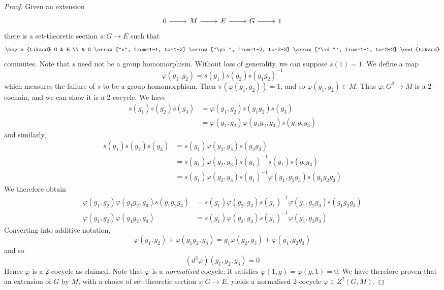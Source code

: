 \begin{proof}
    Given an extension
\[\begin{tikzcd}
	0 & M & E & G & 1
	\arrow[from=1-1, to=1-2]
	\arrow[from=1-2, to=1-3]
	\arrow[from=1-3, to=1-4]
	\arrow[from=1-4, to=1-5]
\end{tikzcd}\]
    there is a set-theoretic section \( s : G \to E \) such that
\[\begin{tikzcd}
	G & E \\
	& G
	\arrow["s", from=1-1, to=1-2]
	\arrow["\pi", from=1-2, to=2-2]
	\arrow["\id"', from=1-1, to=2-2]
\end{tikzcd}\]
    commutes.
    Note that \( s \) need not be a group homomorphism.
    Without loss of generality, we can suppose \( s(1) = 1 \).
    We define a map
    \[ \varphi(g_1, g_2) = s(g_1)s(g_2)s(g_1 g_2)^{-1} \]
    which measures the failure of \( s \) to be a group homomorphism.
    Then \( \pi(\varphi(g_1, g_2)) = 1 \), and so \( \varphi(g_1, g_2) \in M \).
    Thus \( \varphi : G^2 \to M \) is a 2-cochain, and we can show it is a 2-cocycle.
    We have
    \begin{align*}
        s(g_1) s(g_2) s(g_3) &= \varphi(g_1, g_2) s(g_1 g_2) s(g_3) \\
        &= \varphi(g_1, g_2) \varphi(g_1 g_2, g_3) s(g_1 g_2 g_3)
    \end{align*}
    and similarly,
    \begin{align*}
        s(g_1) s(g_2) s(g_3) &= s(g_1) \varphi(g_2, g_3) s(g_2 g_3) \\
        &= s(g_1) \varphi(g_2, g_3) s(g_1)^{-1} s(g_1) s(g_2 g_3) \\
        &= s(g_1) \varphi(g_2, g_3) s(g_1)^{-1} \varphi(g_1, g_2 g_3) s(g_1 g_2 g_3)
    \end{align*}
    We therefore obtain
    \begin{align*}
        \varphi(g_1, g_2) \varphi(g_1 g_2, g_3) s(g_1 g_2 g_3) &= s(g_1) \varphi(g_2, g_3) s(g_1)^{-1} \varphi(g_1, g_2 g_3) s(g_1 g_2 g_3) \\
        \varphi(g_1, g_2) \varphi(g_1 g_2, g_3) &= s(g_1) \varphi(g_2, g_3) s(g_1)^{-1} \varphi(g_1, g_2 g_3)
    \end{align*}
    Converting into additive notation,
    \[ \varphi(g_1, g_2) + \varphi(g_1 g_2, g_3) = g_1 \varphi(g_2, g_3) + \varphi(g_1, g_2 g_3) \]
    and so
    \[ (d^3 \varphi)(g_1, g_2, g_3) = 0 \]
    Hence \( \varphi \) is a 2-cocycle as claimed.
    Note that \( \varphi \) is a \emph{normalised} cocycle: it satisfies \( \varphi(1, g) = \varphi(g, 1) = 0 \).
    We have therefore proven that an extension of \( G \) by \( M \), with a choice of set-theoretic section \( s : G \to E \), yields a normalised 2-cocycle \( \varphi \in Z^2(G, M) \).


\end{proof}

